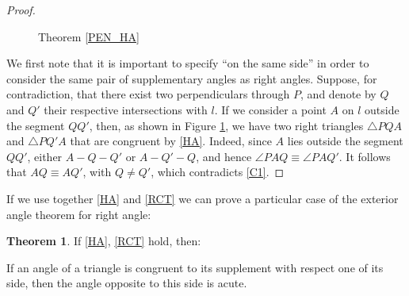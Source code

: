 \documentclass[11pt,a4paper]{article}
\theoremstyle{definition}
\newtheorem{thm}{Theorem}[section]
\theoremstyle{remark}
\numberwithin{equation}{section}
\newcommand{\RightAngle}[5]{%
  \coordinate (RAa) at ($(#1)!#4!(#2)$);
  \coordinate (RAb) at ($(#1)!#5!(#3)$);
  \coordinate (RAc) at ($(RAa)+(RAb)-(#1)$);
  \draw (RAa)--(RAc)--(RAb);
}
\begin{document}
\begin{proof}
\begin{figure}[ht!]
\centering
{}
\caption{Theorem \ref{PEN_HA}}\label{PEN_HA_f}
\end{figure}
We first note that it is important to specify ``on the same side'' in order to consider the same pair of supplementary angles as right angles. Suppose, for contradiction, that there exist two perpendiculars through $P$, and denote by $Q$ and $Q'$ their respective intersections with $l$. If we consider a point $A$ on $l$ outside the segment $QQ'$, then, as shown in Figure \ref{PEN_HA_f}, we have two right triangles $\triangle PQA$ and $\triangle PQ'A$ that are congruent by \ref{HA}. Indeed, since $A$ lies outside the segment $QQ'$, either $A-Q-Q'$ or $A-Q'-Q$, and hence $\angle PAQ\equiv\angle PAQ'$. It follows that $AQ\equiv AQ'$, with $Q\neq Q'$, which contradicts \ref{C1}.
\end{proof}
If we use together \ref{HA} and \ref{RCT} we can prove a particular case of the exterior angle theorem for right angle:
\begin{thm}\label{PEN_HA_EA}
If \ref{HA}, \ref{RCT} hold, then:
\begin{enumerate}[label=\textrm{[}\textbf{EA}\textrm{]}]
  \item If an angle of a triangle is congruent to its supplement with respect one of its side, then the angle opposite to this side is acute.
\end{enumerate}
\end{thm}
\end{document}
